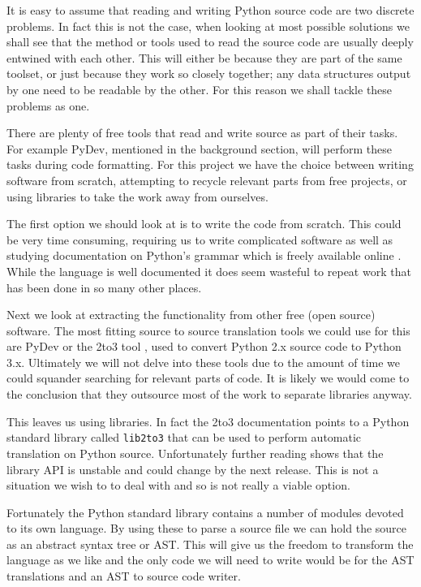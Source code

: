 \documentclass[twoside,a4paper]{report}
\begin{document}
It is easy to assume that reading and writing Python source code are two discrete problems. In fact this is not the case,
when looking at most possible solutions we shall see that the method or tools used to read the source code are usually deeply
entwined with each other. This will either be because they are part of the same toolset, or just because they work so closely together;
any data structures output by one need to be readable by the other. For this reason we shall tackle these problems as one.

There are plenty of free tools that read and write source as part of their tasks. For example PyDev, mentioned in the background section, will
perform these tasks during code formatting. For this project we have the choice between writing software from scratch, attempting
to recycle relevant parts from free projects, or using libraries to take the work away from ourselves.

The first option we should look at is to write the code from scratch. This could be very time consuming, requiring
us to write complicated software as well as studying documentation on Python's grammar which is freely available online \cite{pygrammar}.
While the language is well documented it does seem wasteful to repeat work that has been done in so many other places.

Next we look at extracting the functionality from other free (open source) software. The most fitting source to source translation tools
we could use for this are PyDev or the 2to3 tool \cite{2to3}, used to convert Python 2.x source code to Python 3.x. Ultimately we will not
delve into these tools due to the amount of time we could squander searching for relevant parts of code. It is likely we
would come to the conclusion that they outsource most of the work to separate libraries anyway.

This leaves us using libraries. In fact the 2to3 documentation points to a Python standard library called \texttt{lib2to3} that can be used to
perform automatic translation on Python source. Unfortunately further reading shows that the library API is unstable and could change by
the next release. This is not a situation we wish to to deal with and so is not really a viable option.

Fortunately the Python standard library contains a number of modules devoted to its own language. By using these to parse a source file
we can hold the source as an abstract syntax tree or AST. This will give us the freedom to transform the language as we like and the only code we
will need to write would be for the AST translations and an AST to source code writer.
\end{document}

